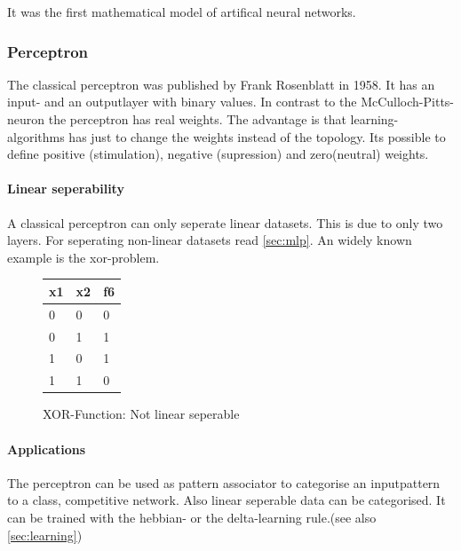 \documentclass[10pt,a4paper,DIV=11]{scrreprt}
\begin{document}
It was the first mathematical model of artifical neural networks.\cite{NEURONMATH}


\subsubsection{Perceptron}
The classical perceptron was published by Frank Rosenblatt in 1958.
It has an input- and an outputlayer with binary values. In contrast to the McCulloch-Pitts-neuron
the perceptron has real weights. The advantage is that learning-algorithms has just to change the weights
instead of the topology. Its possible to define positive (stimulation), negative (supression) and zero(neutral) weights.

\paragraph{Linear seperability}
A classical perceptron can only seperate linear datasets. This is due to only two layers. For seperating non-linear datasets read \ref{sec:mlp}.
An widely known example is the xor-problem.

\begin{figure}[H]
	\centering
	\begin{tabular}{|l|l|l|}
		\hline
		x1 & x2 & f6\\
		\hline
		0 & 0 & 0 \\
		\hline
		0 & 1 & 1 \\
		\hline
		1 & 0 & 1 \\
		\hline
		1 & 1 & 0 \\
		\hline
	\end{tabular}
	\caption{XOR-Function: Not linear seperable}
	\label{fig:linsep1}
	
	
\end{figure}

\paragraph{Applications}
The perceptron can be used as pattern associator to categorise an inputpattern to a class, competitive network. Also linear seperable data can be categorised.
It can be trained with the hebbian- or the delta-learning rule.(see also \eqref{sec:learning})
\end{document}
